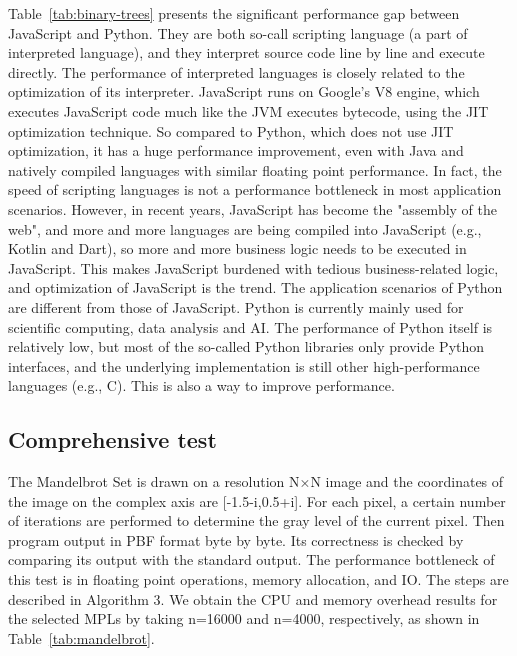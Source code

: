 Table~\ref{tab:binary-trees} presents the significant performance gap between JavaScript and Python.
They are both so-call scripting language (a part of interpreted language),
and they interpret source code line by line and execute directly.
The performance of interpreted languages is closely related to the optimization of its interpreter.
JavaScript runs on Google's V8 engine, which executes JavaScript code much like the
JVM executes bytecode, using the JIT optimization technique.
So compared to Python, which does not use JIT optimization, it has a huge performance
improvement, even with Java and natively compiled languages with similar floating point performance.
In fact, the speed of scripting languages is not a performance bottleneck in most application scenarios.
However, in recent years, JavaScript has become the "assembly of the web",
and more and more languages are being compiled into JavaScript (e.g., Kotlin and Dart),
so more and more business logic needs to be executed in JavaScript.
This makes JavaScript burdened with tedious business-related logic, and optimization of JavaScript is the trend.
The application scenarios of Python are different from those of JavaScript.
Python is currently mainly used for scientific computing, data analysis and AI\@.
The performance of Python itself is relatively low, but most of the so-called Python libraries
only provide Python interfaces, and the underlying implementation is still other high-performance
languages (e.g., C).
This is also a way to improve performance.

\subsection{Comprehensive test}

The Mandelbrot Set is drawn on a resolution N×N image and the coordinates of the image on the complex axis are [-1.5-i,0.5+i].
For each pixel, a certain number of iterations are performed to determine the gray level of the current pixel.
Then program output in PBF format byte by byte.
Its correctness is checked by comparing its output with the standard output.
The performance bottleneck of this test is in floating point operations, memory allocation, and IO\@.
The steps are described in Algorithm 3.
We obtain the CPU and memory overhead results for the selected MPLs by taking n=16000 and n=4000, respectively,
as shown in Table~\ref{tab:mandelbrot}.

